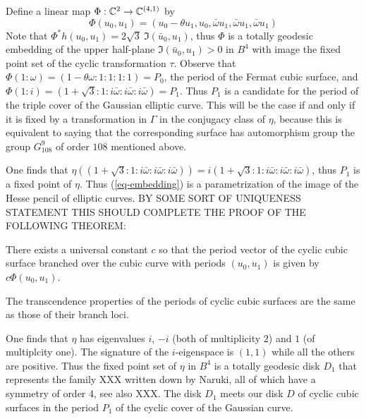 Define a linear map $\Phi:{ \mathbb C }^2\to { \mathbb C }^{(4,1)}$ by \begin{equation}
\label{eq-embedding} \Phi(u_0,u_1) = (u_0 - \theta u_1,u_0,\bar\omega u_1,\bar\omega
u_1,\bar\omega u_1) \end{equation} Note that $\Phi^* h (u_0,u_1) = 2\sqrt{3}\ \Im{ (
\bar u_0, u_1)}$, thus $\Phi$ is a totally geodesic embedding of the upper half-plane
$\Im{(\bar u_0, u_1)} >0 $ in $B^4$ with image the fixed point set of the cyclic
transformation $\tau$. Observe that $\Phi(1:\omega) = (1 - \theta\omega : 1:1:1:1) =
P_0$, the period of the Fermat cubic surface, and $\Phi(1:i) =
(1+\sqrt{3}:1:i\bar\omega:i\bar\omega:i\bar\omega) = P_1$. Thus $P_1$ is a candidate
for the period of the triple cover of the Gaussian elliptic curve. This will be the
case if and only if it is fixed by a transformation in $\Gamma$ in the conjugacy class
of $\eta$, because this is equivalent to saying that the corresponding surface has
automorphism group the group $G_{108}^9$ of order $108$ mentioned above.

One finds that $\eta((1+\sqrt{3}:1:i\bar\omega:i\bar\omega:i\bar\omega)) = i
(1+\sqrt{3}:1:i\bar\omega:i\bar\omega:i\bar\omega)$, thus $P_1$ is a fixed point of
$\eta$. Thus (\ref{eq-embedding}) is a parametrization of the image of the Hesse pencil
of elliptic curves. BY SOME SORT OF UNIQUENESS STATEMENT THIS SHOULD COMPLETE THE PROOF
OF THE FOLLOWING THEOREM:

\begin{theorem} There exists a universal constant $c$ so that the period vector of the
cyclic cubic surface branched over the cubic curve with periods $(u_0,u_1)$ is given by
$c\Phi(u_0,u_1)$.

\end{theorem}


\begin{corollary} The transcendence properties of the periods of cyclic cubic surfaces
are the same as those of their branch loci. \end{corollary}

\begin{remark} One finds that $\eta$ has eigenvalues $i$, $-i$ (both of multiplicity
$2$) and $1$ (of multiplcity one). The signature of the $i$-eigenspace is $(1,1)$ while
all the others are positive. Thus the fixed point set of $\eta$ in $B^4$ is a totally
geodesic disk $D_1$ that represents the family XXX written down by Naruki, all of which
have a symmetry of order $4$, see also XXX. The disk $D_1$ meets our disk $D$ of cyclic
cubic surfaces in the period $P_1$ of the cyclic cover of the Gaussian curve.
\end{remark}


